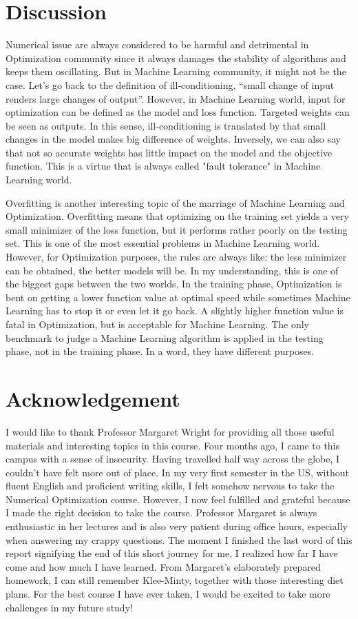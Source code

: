 \documentclass{article} %
\begin{document}
\section{Discussion}
Numerical issue are always considered to be harmful and detrimental in Optimization community since it always damages the stability of algorithms and keeps them oscillating. But in Machine Learning community, it might not be the case. Let's go back to the definition of ill-conditioning, “small change of input renders large changes of output”. However, in Machine Learning world, input for optimization can be defined as the model and loss function. Targeted weights can be seen as outputs. In this sense, ill-conditioning is translated by that small changes in the model makes big difference of weights. Inversely, we can also say that not so accurate weights has little impact on the model and the objective function. This is a virtue that is always called "fault tolerance" in Machine Learning world.

Overfitting is another interesting topic of the marriage of Machine Learning and Optimization. Overfitting means that optimizing on the training set yields a very small minimizer of the loss function, but it performs rather poorly on the testing set. This is one of the most essential problems in Machine Learning world. However, for Optimization purposes, the rules are always like: the less minimizer can be obtained, the better models will be. In my understanding, this is one of the biggest gaps between the two worlds. In the training phase, Optimization is bent on getting a lower function value at optimal speed while sometimes Machine Learning has to stop it or even let it go back. A slightly higher function value is fatal in Optimization, but is acceptable for Machine Learning. The only benchmark to judge a Machine Learning algorithm is applied in the testing phase, not in the training phase. In a word, they have different purposes.

\newpage
\section*{Acknowledgement}
I would like to thank Professor Margaret Wright for providing all those useful materials and interesting topics in this course. Four months ago, I came to this campus with a sense of insecurity. Having travelled half way across the globe, I couldn't have felt more out of place. In my very first semester in the US, without fluent English and proficient writing skills, I felt somehow nervous to take the Numerical Optimization course. However, I now feel fulfilled and grateful because I made the right decision to take the course. Professor Margaret is always enthusiastic in her lectures and is also very patient during office hours, especially when answering my crappy questions. The moment I finished the last word of this report signifying the end of this short journey for me, I realized how far I have come and how much I have learned. From Margaret's elaborately prepared homework, I can still remember Klee-Minty, together with those interesting diet plans. For the best course I have ever taken, I would be excited to take more challenges in my future study!
\end{document}
